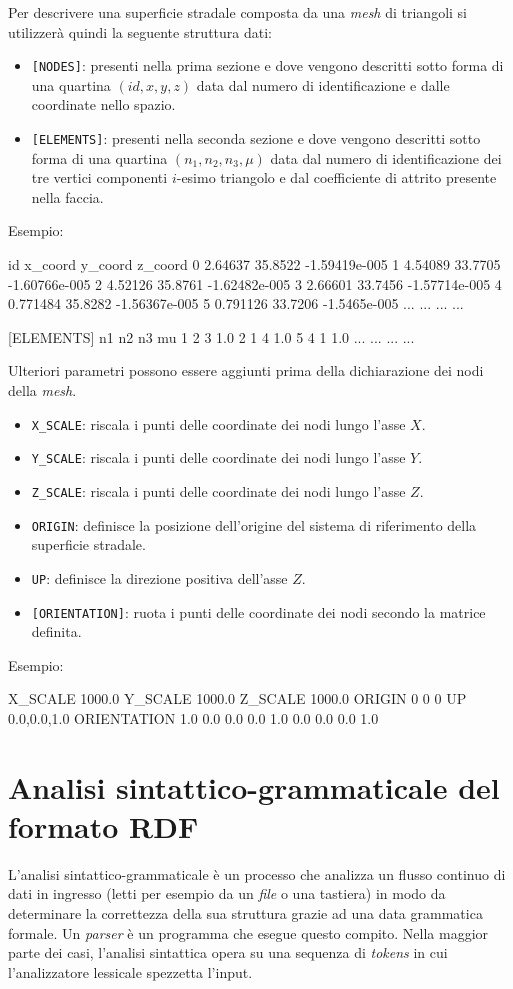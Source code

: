 Per descrivere una superficie stradale composta da una \textit{mesh} di triangoli si utilizzerà quindi la seguente struttura dati:
\begin{itemize}
	\item \texttt{[NODES]}: presenti nella prima sezione e dove vengono descritti sotto forma di una quartina $(id,x,y,z)$ data dal numero di identificazione e dalle coordinate nello spazio.
	\item \texttt{[ELEMENTS]}: presenti nella seconda sezione e dove vengono descritti sotto forma di una quartina $(n_1,n_2,n_3,\mu)$ data dal numero di identificazione dei tre vertici componenti $i$-esimo triangolo e dal coefficiente di attrito presente nella faccia.
\end{itemize}
Esempio:
\begin{pseudoc}
	[NODES]
	{ id x_coord y_coord z_coord }
	0 2.64637 35.8522 -1.59419e-005 
	1 4.54089 33.7705 -1.60766e-005 
	2 4.52126 35.8761 -1.62482e-005 
	3 2.66601 33.7456 -1.57714e-005 
	4 0.771484 35.8282 -1.56367e-005 
	5 0.791126 33.7206 -1.5465e-005
	... ... ... ...
	
	[ELEMENTS]
	{ n1 n2 n3 mu }
	1 2 3 1.0 
	2 1 4 1.0 
	5 4 1 1.0 
	... ... ... ...
\end{pseudoc}

Ulteriori parametri possono essere aggiunti prima della dichiarazione dei nodi della \textit{mesh}.
\begin{itemize}
	\item \texttt{X\_SCALE}: riscala i punti delle coordinate dei nodi lungo l'asse $X$.
	\item \texttt{Y\_SCALE}: riscala i punti delle coordinate dei nodi lungo l'asse $Y$.
	\item \texttt{Z\_SCALE}: riscala i punti delle coordinate dei nodi lungo l'asse $Z$.
	\item \texttt{ORIGIN}: definisce la posizione dell'origine del sistema di riferimento della superficie stradale.
	\item \texttt{UP}: definisce la direzione positiva dell'asse $Z$.
	\item \texttt{[ORIENTATION]}: ruota i punti delle coordinate dei nodi secondo la matrice definita.
\end{itemize}
Esempio:
\begin{pseudoc}
	X_SCALE
	1000.0
	Y_SCALE
	1000.0
	Z_SCALE
	1000.0
	ORIGIN
	0 0 0
	UP
	0.0,0.0,1.0
	ORIENTATION
	1.0  0.0  0.0
	0.0  1.0  0.0
	0.0  0.0  1.0
\end{pseudoc}
%
\section{Analisi sintattico-grammaticale del formato RDF}
%
L'analisi sintattico-grammaticale è un processo che analizza un flusso continuo di dati in ingresso (letti per esempio da un \textit{file} o una tastiera) in modo da determinare la correttezza della sua struttura grazie ad una data grammatica formale. Un \textit{parser} è un programma che esegue questo compito. Nella maggior parte dei casi, l'analisi sintattica opera su una sequenza di \textit{tokens} in cui l'analizzatore lessicale spezzetta l'input.

